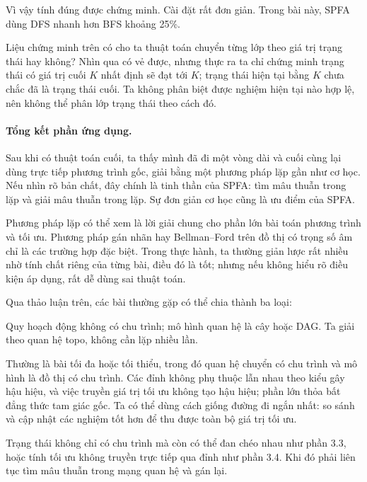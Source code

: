 \documentclass[11pt]{article}
\begin{document}
Vì vậy tính đúng được chứng minh. Cài đặt rất đơn giản. Trong bài này, SPFA
dùng DFS nhanh hơn BFS khoảng 25\%.

Liệu chứng minh trên có cho ta thuật toán chuyển từng lớp theo giá trị trạng
thái hay không? Nhìn qua có vẻ được, nhưng thực ra ta chỉ chứng minh trạng
thái có giá trị cuối \(K\) nhất định sẽ đạt tới \(K\); trạng thái hiện tại
bằng \(K\) chưa chắc đã là trạng thái cuối. Ta không phân biệt được nghiệm
hiện tại nào hợp lệ, nên không thể phân lớp trạng thái theo cách đó.

\paragraph{Tổng kết phần ứng dụng.}
Sau khi có thuật toán cuối, ta thấy mình đã đi một vòng dài và cuối cùng lại
dùng trực tiếp phương trình gốc, giải bằng một phương pháp lặp gần như cơ học.
Nếu nhìn rõ bản chất, đây chính là tinh thần của SPFA: tìm mâu thuẫn trong
lặp và giải mâu thuẫn trong lặp. Sự đơn giản cơ học cũng là ưu điểm của SPFA.

Phương pháp lặp có thể xem là lời giải chung cho phần lớn bài toán phương
trình và tối ưu. Phương pháp gán nhãn hay Bellman--Ford trên đồ thị có trọng
số âm chỉ là các trường hợp đặc biệt. Trong thực hành, ta thường giản lược rất
nhiều nhờ tính chất riêng của từng bài, điều đó là tốt; nhưng nếu không hiểu
rõ điều kiện áp dụng, rất dễ dùng sai thuật toán.

Qua thảo luận trên, các bài thường gặp có thể chia thành ba loại:
\begin{description}[leftmargin=2.6em,style=nextline]
  \item[Loại thứ nhất] Quy hoạch động không có chu trình; mô hình quan hệ là
  cây hoặc DAG. Ta giải theo quan hệ topo, không cần lặp nhiều lần.

  \item[Loại thứ hai] Thường là bài tối đa hoặc tối thiểu, trong đó quan hệ
  chuyển có chu trình và mô hình là đồ thị có chu trình. Các đỉnh không phụ
  thuộc lẫn nhau theo kiểu gây hậu hiệu, và việc truyền giá trị tối ưu không
  tạo hậu hiệu; phần lớn thỏa bất đẳng thức tam giác gốc. Ta có thể dùng cách
  giống đường đi ngắn nhất: so sánh và cập nhật các nghiệm tốt hơn để thu được
  toàn bộ giá trị tối ưu.

  \item[Loại thứ ba] Trạng thái không chỉ có chu trình mà còn có thể đan chéo
  nhau như phần 3.3, hoặc tính tối ưu không truyền trực tiếp qua đỉnh như phần
  3.4. Khi đó phải liên tục tìm mâu thuẫn trong mạng quan hệ và gán lại.
\end{description}
\end{document}
